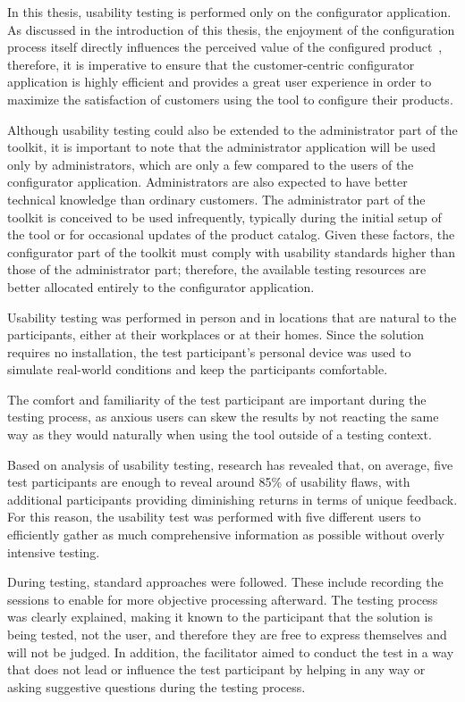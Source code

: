 In this thesis, usability testing is performed only on the configurator application. As discussed in the introduction of this thesis, the enjoyment of the configuration process itself directly influences the perceived value of the configured product~\cite{Franke2010}, therefore, it is imperative to ensure that the customer-centric configurator application is highly efficient and provides a great user experience in order to maximize the satisfaction of customers using the tool to configure their products.

Although usability testing could also be extended to the administrator part of the toolkit, it is important to note that the administrator application will be used only by administrators, which are only a few compared to the users of the configurator application. Administrators are also expected to have better technical knowledge than ordinary customers. The administrator part of the toolkit is conceived to be used infrequently, typically during the initial setup of the tool or for occasional updates of the product catalog. Given these factors, the configurator part of the toolkit must comply with usability standards higher than those of the administrator part; therefore, the available testing resources are better allocated entirely to the configurator application.

Usability testing was performed in person and in locations that are natural to the participants, either at their workplaces or at their homes. Since the solution requires no installation, the test participant's personal device was used to simulate real-world conditions and keep the participants comfortable.

The comfort and familiarity of the test participant are important during the testing process, as anxious users can skew the results by not reacting the same way as they would naturally when using the tool outside of a testing context.~\cite{Nielsen1994}

Based on analysis of usability testing, research has revealed that, on average, five test participants are enough to reveal around 85\% of usability flaws, with additional participants providing diminishing returns in terms of unique feedback. \cite{Nielsen2000} For this reason, the usability test was performed with five different users to efficiently gather as much comprehensive information as possible without overly intensive testing.  

During testing, standard approaches were followed. These include recording the sessions to enable for more objective processing afterward. The testing process was clearly explained, making it known to the participant that the solution is being tested, not the user, and therefore they are free to express themselves and will not be judged. In addition, the facilitator aimed to conduct the test in a way that does not lead or influence the test participant by helping in any way or asking suggestive questions during the testing process.~\cite{Moran2019}

